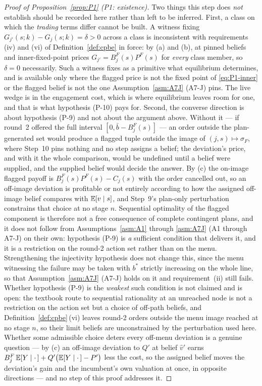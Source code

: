 \begin{proof}[Proof of Proposition~\ref{prop:P1} (P1: existence)]
Two things this step does \emph{not} establish should be recorded here rather than left to be
inferred. First, a class on which the \emph{trading} terms differ cannot be built. A witness fixing
$G_{j'}(s;k) - G_j(s;k) = \delta > 0$ across a class is inconsistent with requirements (iv) and (vi)
of Definition~\ref{def:cpbe} in force: by (a) and (b), at pinned beliefs and inner-fixed-point prices
$G_{j'} = B_j^F(s)P^F(s)$ for \emph{every} class member, so $\delta = 0$ necessarily. Such a witness
fixes as a primitive what equilibrium determines, and is available only where the flagged price is
not the fixed point of \eqref{eq:P1-inner} or the flagged belief is not the one
Assumption~\ref{asm:A7J} (A7-J) pins. The live wedge is in the engagement cost, which is where equilibrium
leaves room for one, and that is what hypothesis (P-10) pays for. Second, the converse direction is
about hypothesis (P-9) and not about the argument above. Without it --- if round~2 offered the full
interval $[0,\bar b-B_j^F(s)]$ --- an order outside the plan-generated set would produce a flagged
tuple outside the image of $(j,s) \mapsto \sigma_F$, where Step~10 pins nothing and no step assigns a
belief; the deviation's price, and with it the whole comparison, would be undefined until a belief
were supplied, and the supplied belief would decide the answer. By (c) the on-image flagged payoff is
$B_j^F(s)P^F(s)-C_j(s)$ with the order cancelled out, so an off-image deviation is profitable or not
entirely according to how the assigned off-image belief compares with $\mathbb{E}[v \mid s]$, and Step~9's
plan-only perturbation constrains that choice at no stage $n$. Sequential optimality of the flagged
component is therefore not a free consequence of complete contingent plans, and it does not follow
from Assumptions~\ref{asm:A1} through \ref{asm:A7J} (A1 through A7-J) on their own: hypothesis (P-9) is \emph{a} sufficient
condition that delivers it, and it is a restriction on the round-2 action set rather than on the
menu. Strengthening the injectivity hypothesis does not change this, since the menu witnessing the
failure may be taken with $b^*$ strictly increasing on the whole line, so that
Assumption~\ref{asm:A7J} (A7-J) holds on it and requirement~(ii) still fails. Whether hypothesis (P-9) is
the \emph{weakest} such condition is not claimed and is open: the textbook route to sequential
rationality at an unreached node is not a restriction on the action set but a choice of off-path
beliefs, and Definition~\ref{def:cpbe}\,(vi) leaves round-2 orders outside the menu image reached at
no stage $n$, so their limit beliefs are unconstrained by the perturbation used here. Whether some
admissible choice deters every off-menu deviation is a genuine question --- by (c) an off-image
deviation to $Q'$ at belief $\hat v'$ earns
$B_j^F\,\mathbb{E}[Y \mid \cdot\,] + Q'\bigl(\mathbb{E}[Y \mid \cdot\,]-P'\bigr)$ less the cost, so the assigned
belief moves the deviation's gain and the incumbent's own valuation at once, in opposite directions
--- and no step of this proof addresses it.


\end{proof}
